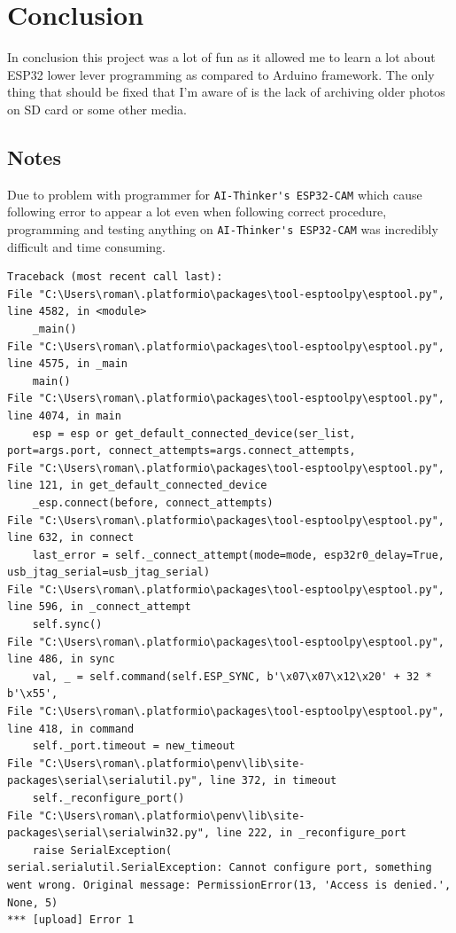 \documentclass{article}
\begin{document}
    \clearpage
    \section{Conclusion}
    In conclusion this project was a lot of fun as it allowed me to learn a lot about 
    ESP32 lower lever programming as compared to Arduino framework.
    The only thing that should be fixed that I'm aware of is the lack of archiving older photos on SD card or some other media.
    
    \subsection{Notes}
    Due to problem with programmer for \verb|AI-Thinker's ESP32-CAM| which cause following error to appear a lot even 
    when following correct procedure, programming and testing anything on \verb|AI-Thinker's ESP32-CAM| was incredibly difficult and time consuming.
    \begin{lstlisting}
Traceback (most recent call last):
File "C:\Users\roman\.platformio\packages\tool-esptoolpy\esptool.py", line 4582, in <module>
    _main()
File "C:\Users\roman\.platformio\packages\tool-esptoolpy\esptool.py", line 4575, in _main
    main()
File "C:\Users\roman\.platformio\packages\tool-esptoolpy\esptool.py", line 4074, in main
    esp = esp or get_default_connected_device(ser_list, port=args.port, connect_attempts=args.connect_attempts,
File "C:\Users\roman\.platformio\packages\tool-esptoolpy\esptool.py", line 121, in get_default_connected_device
    _esp.connect(before, connect_attempts)
File "C:\Users\roman\.platformio\packages\tool-esptoolpy\esptool.py", line 632, in connect
    last_error = self._connect_attempt(mode=mode, esp32r0_delay=True, usb_jtag_serial=usb_jtag_serial)
File "C:\Users\roman\.platformio\packages\tool-esptoolpy\esptool.py", line 596, in _connect_attempt
    self.sync()
File "C:\Users\roman\.platformio\packages\tool-esptoolpy\esptool.py", line 486, in sync
    val, _ = self.command(self.ESP_SYNC, b'\x07\x07\x12\x20' + 32 * b'\x55',
File "C:\Users\roman\.platformio\packages\tool-esptoolpy\esptool.py", line 418, in command
    self._port.timeout = new_timeout
File "C:\Users\roman\.platformio\penv\lib\site-packages\serial\serialutil.py", line 372, in timeout
    self._reconfigure_port()
File "C:\Users\roman\.platformio\penv\lib\site-packages\serial\serialwin32.py", line 222, in _reconfigure_port
    raise SerialException(
serial.serialutil.SerialException: Cannot configure port, something went wrong. Original message: PermissionError(13, 'Access is denied.', None, 5)
*** [upload] Error 1
    \end{lstlisting}
    
\end{document}
